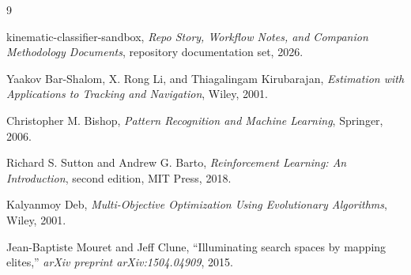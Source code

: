 \documentclass[11pt]{article}
\begin{document}
\clearpage
{}
\begin{thebibliography}{9}

kinematic-classifier-sandbox,
\textit{Repo Story, Workflow Notes, and Companion Methodology Documents},
repository documentation set, 2026.

Yaakov Bar-Shalom, X. Rong Li, and Thiagalingam Kirubarajan,
\textit{Estimation with Applications to Tracking and Navigation},
Wiley, 2001.

Christopher M. Bishop,
\textit{Pattern Recognition and Machine Learning},
Springer, 2006.

Richard S. Sutton and Andrew G. Barto,
\textit{Reinforcement Learning: An Introduction},
second edition, MIT Press, 2018.

Kalyanmoy Deb,
\textit{Multi-Objective Optimization Using Evolutionary Algorithms},
Wiley, 2001.

Jean-Baptiste Mouret and Jeff Clune,
``Illuminating search spaces by mapping elites,''
\textit{arXiv preprint arXiv:1504.04909}, 2015.

\end{thebibliography}
\end{document}
